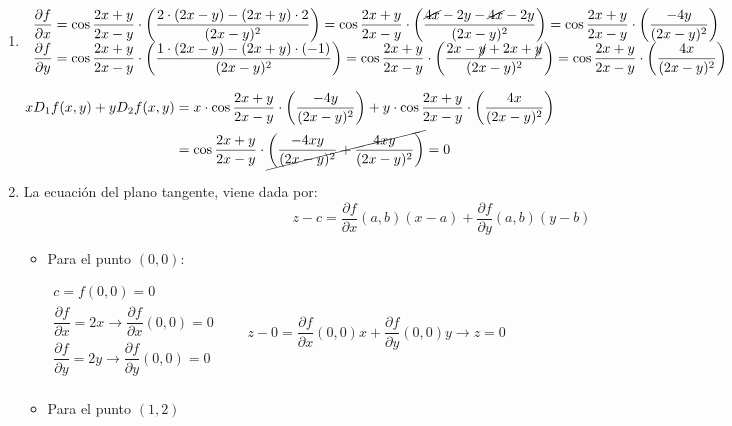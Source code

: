 \begin{enumerate}[label=\c olor{red}\textbf{\arabic*)}, leftmargin=*]
\item {}

$\begin{array}{l}
\dfrac{\partial f}{\partial x}=\cos\dfrac{2x+y}{2x-y}\cdot\left(\dfrac{2\cdot(2x-y)-(2x+y)\cdot2}{(2x-y)^{2}}\right)=\cos\dfrac{2x+y}{2x-y}\cdot\left(\dfrac{\cancel{4x}-2y-\cancel{4x}-2y}{(2x-y)^{2}}\right)=\cos\dfrac{2x+y}{2x-y}\cdot\left(\dfrac{-4y}{(2x-y)^{2}}\right)\\
\dfrac{\partial f}{\partial y}=\cos\dfrac{2x+y}{2x-y}\cdot\left(\dfrac{1\cdot(2x-y)-(2x+y)\cdot(-1)}{(2x-y)^{2}}\right)=\cos\dfrac{2x+y}{2x-y}\cdot\left(\dfrac{2x-\cancel{y}+2x+\cancel{y}}{(2x-y)^{2}}\right)=\cos\dfrac{2x+y}{2x-y}\cdot\left(\dfrac{4x}{(2x-y)^{2}}\right)
\end{array}$

$\begin{aligned}
xD_1f(x,y)+yD_2f(x,y)&=x\cdot\cos\dfrac{2x+y}{2x-y}\cdot\left(\dfrac{-4y}{(2x-y)^{2}}\right)+y\cdot\cos\dfrac{2x+y}{2x-y}\cdot\left(\dfrac{4x}{(2x-y)^{2}}\right)\\
&=\cos\dfrac{2x+y}{2x-y}\cdot\cancel{\left(\dfrac{-4xy}{(2x-y)^{2}}+\dfrac{4xy}{(2x-y)^{2}}\right)}=0
\end{aligned}$

\item {}

La ecuación del plano tangente, viene dada por: \[ z-c=\dfrac{\partial f}{\partial x}(a,b)(x-a)+\dfrac{\partial f}{\partial y}(a,b)(y-b) \]
\begin{itemize}
\item Para el punto $(0,0)$:

$\begin{array}{l}
c=f(0,0)=0\\
\dfrac{\partial f}{\partial x}=2x\longrightarrow\dfrac{\partial f}{\partial x}(0,0)=0\\
\dfrac{\partial f}{\partial y}=2y\longrightarrow\dfrac{\partial f}{\partial y}(0,0)=0\\
\end{array}\qquad z-0=\dfrac{\partial f}{\partial x}(0,0)x+\dfrac{\partial f}{\partial y}(0,0)y\longrightarrow z=0$

\item Para el punto $(1,2)$


\end{itemize}
\end{enumerate}
